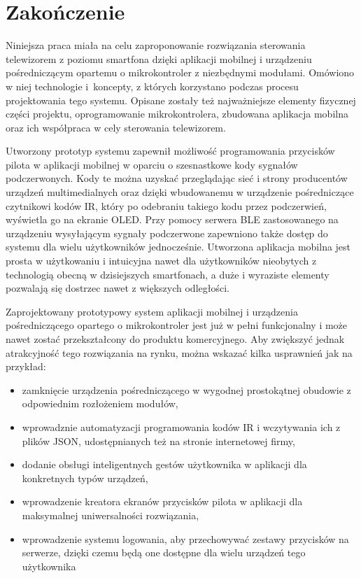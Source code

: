\documentclass[12pt,twoside]{article}
\begin{document}
\clearpage

\section{Zakończenie}

Niniejsza praca miała na celu zaproponowanie rozwiązania sterowania telewizorem z poziomu smartfona dzięki aplikacji mobilnej i urządzeniu pośredniczącym opartemu o mikrokontroler z niezbędnymi modułami. Omówiono w niej technologie i~koncepty, z których korzystano podczas procesu projektowania tego systemu. Opisane zostały też najważniejsze elementy fizycznej części projektu, oprogramowanie mikrokontrolera, zbudowana aplikacja mobilna oraz ich współpraca w cely sterowania telewizorem.

Utworzony prototyp systemu zapewnił możliwość programowania przycisków pilota w aplikacji mobilnej w oparciu o szesnastkowe kody sygnałów podczerwonych. Kody te można uzyskać przeglądając sieć i strony producentów urządzeń multimedialnych oraz dzięki wbudowanemu w urządzenie pośredniczące czytnikowi kodów IR, który po odebraniu takiego kodu przez podczerwień, wyświetla go na ekranie OLED. Przy pomocy serwera BLE zastosowanego na urządzeniu wysyłającym sygnały podczerwone zapewniono także dostęp do systemu dla wielu użytkowników jednocześnie. Utworzona aplikacja mobilna jest prosta w użytkowaniu i intuicyjna nawet dla użytkowników nieobytych z technologią obecną w dzisiejszych smartfonach, a duże i wyraziste elementy pozwalają się dostrzec nawet z większych odległości.

Zaprojektowany prototypowy system aplikacji mobilnej i urządzenia pośredniczącego opartego o mikrokontroler jest już w pełni funkcjonalny i może nawet zostać przekształcony do produktu komercyjnego. Aby zwiększyć jednak atrakcyjność tego rozwiązania na rynku, można wskazać kilka usprawnień jak na przykład:
\begin{itemize}[label=-,labelsep=0.4cm,leftmargin=0.65cm]
   \item zamknięcie urządzenia pośredniczącego w wygodnej prostokątnej obudowie z odpowiednim rozłożeniem modułów,
   \item wprowadznie automatyzacji programowania kodów IR i wczytywania ich z plików JSON, udostępnianych też na stronie internetowej firmy,
   \item dodanie obsługi inteligentnych gestów użytkownika w aplikacji dla konkretnych typów urządzeń,
   \item wprowadzenie kreatora ekranów przycisków pilota w aplikacji dla maksymalnej uniwersalności rozwiązania,
   \item wprowadzenie systemu logowania, aby przechowywać zestawy przycisków na serwerze, dzięki czemu będą one dostępne dla wielu urządzeń tego użytkownika
   
\end{itemize}
\end{document}

